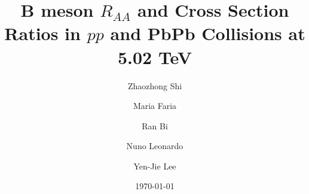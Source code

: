 \documentclass[11pt,twoside,a4paper,an]{cms-tdr}
\begin{document}
%
%
%


%
%
%



\title{B meson $R_{AA}$ and Cross Section Ratios in $pp$ and PbPb Collisions at 5.02 TeV}

\address[mit]{Massachusetts Inst. of Technology}
\address[tls]{T\'{e}cnico Lisboa}
\author[mit]{Zhaozhong Shi}
\author[tls]{Maria Faria}
\author[mit]{}
\author[mit]{Ran Bi}
\author[tls]{Nuno Leonardo}
\author[mit]{Yen-Jie Lee}



\date{\today}

\end{document}
